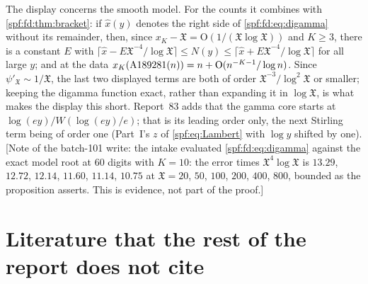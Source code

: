 \documentclass[11pt]{article}
\numberwithin{equation}{section}
\theoremstyle{definition}
\theoremstyle{remark}
\theoremstyle{definition}
\newcommand{\Aone}{\textnormal{A189281}}
\newcommand{\bigO}{\mathrm O}
\begin{document}
The display concerns the smooth model. For the counts it combines with
\cref{spf:fd:thm:bracket}: if $\hat x(y)$ denotes the right side of
\eqref{spf:fd:eq:digamma} without its remainder, then, since
$x_K-\mathfrak X=\bigO(1/(\mathfrak X\log\mathfrak X))$ and $K\ge3$, there is
a constant $E$ with
$\lceil\hat x-E\mathfrak X^{-4}/\log\mathfrak X\rceil\le N(y)\le
\lceil\hat x+E\mathfrak X^{-4}/\log\mathfrak X\rceil$ for all large $y$; and
at the data $x_K(\Aone(n))=n+\bigO(n^{-K-1}/\log n)$. Since
$\psi'_{\mathfrak X}\sim1/\mathfrak X$, the last two displayed terms are both
of order $\mathfrak X^{-3}/\log^2\mathfrak X$ or smaller; keeping the
digamma function exact, rather than expanding it in $\log\mathfrak X$, is
what makes the display this short. Report~83 adds that the gamma core starts
at $\log(ey)/W(\log(ey)/e)$; that is its leading order only, the next
Stirling term being of order one (Part~I's $z$ of \eqref{spf:eq:Lambert} with
$\log y$ shifted by one). [Note of the batch-101 write: the intake evaluated
\eqref{spf:fd:eq:digamma} against the exact model root at 60 digits with
$K=10$: the error times $\mathfrak X^4\log\mathfrak X$ is $13.29$, $12.72$,
$12.14$, $11.60$, $11.14$, $10.75$ at $\mathfrak X=20$, $50$, $100$, $200$,
$400$, $800$, bounded as the proposition asserts. This is evidence, not part
of the proof.]

\section{Literature that the rest of the report does not cite}
\label{spf:fd:sec:literature}
\end{document}
